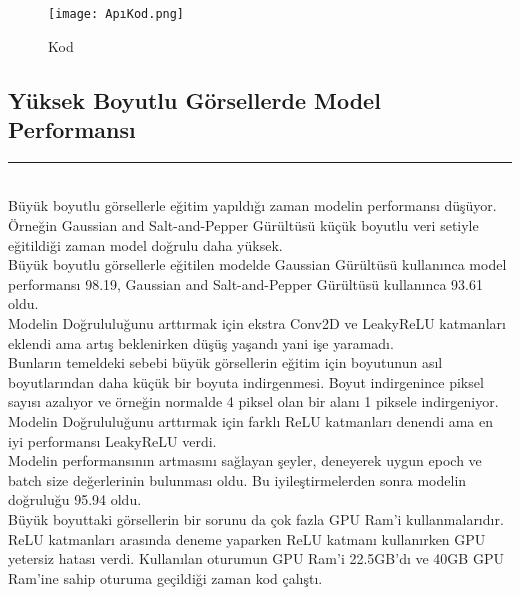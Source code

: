 \documentclass{article}
\begin{document}
\renewcommand{\figurename}{Şekil}
\begin{figure}[htbp]
     \centering
\texttt{[image: ApıKod.png]}\centering 
  \caption{Kod}
  \label{fig:resim_etiketi}
\end{figure}

\clearpage
\subsection{Yüksek Boyutlu Görsellerde Model Performansı}
\rule{\textwidth}{0.5pt}\\[10pt]


\noindent Büyük boyutlu görsellerle eğitim yapıldığı zaman modelin performansı düşüyor. Örneğin Gaussian and Salt-and-Pepper Gürültüsü küçük boyutlu veri setiyle eğitildiği zaman model doğrulu daha yüksek. \\[10pt]

\noindent Büyük boyutlu görsellerle eğitilen modelde Gaussian Gürültüsü kullanınca model performansı 98.19, Gaussian and Salt-and-Pepper Gürültüsü kullanınca 93.61 oldu.  \\[10pt]

\noindent Modelin Doğrululuğunu arttırmak için ekstra Conv2D ve LeakyReLU katmanları eklendi ama artış beklenirken düşüş yaşandı yani işe yaramadı. \\[10pt]

\noindent Bunların temeldeki sebebi büyük görsellerin eğitim için boyutunun asıl boyutlarından daha küçük bir boyuta indirgenmesi. Boyut indirgenince piksel sayısı azalıyor ve örneğin normalde 4 piksel olan bir alanı 1 piksele indirgeniyor.\\[10pt]

\noindent Modelin Doğrululuğunu arttırmak için farklı ReLU katmanları denendi ama en iyi performansı LeakyReLU verdi.\\[10pt]

\noindent Modelin performansının artmasını sağlayan şeyler, deneyerek uygun epoch ve batch size değerlerinin bulunması oldu. Bu iyileştirmelerden sonra modelin doğruluğu 95.94 oldu.\\[10pt]


\noindent Büyük boyuttaki görsellerin bir sorunu da çok fazla GPU Ram'i kullanmalarıdır. ReLU katmanları arasında deneme yaparken ReLU katmanı kullanırken GPU yetersiz hatası verdi. Kullanılan oturumun GPU Ram'i 22.5GB'dı ve 40GB GPU Ram'ine sahip oturuma geçildiği zaman kod çalıştı. \\[10pt]
\end{document}
